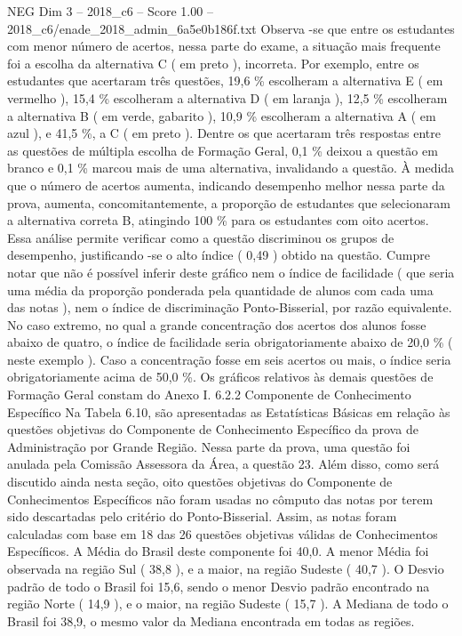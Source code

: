 \begin{textsample}{NEG Dim 3 – 2018\_c6 – Score 1.00 – 2018\_c6/enade\_2018\_admin\_6a5e0b186f.txt}
Observa -se que entre os estudantes com menor número de acertos, nessa parte do exame, a situação mais frequente foi a escolha da alternativa C ( em preto ), incorreta.
Por exemplo, entre os estudantes que acertaram três questões, 19,6 \% escolheram a alternativa E ( em vermelho ), 15,4 \% escolheram a alternativa D ( em laranja ), 12,5 \% escolheram a alternativa B ( em verde, gabarito ), 10,9 \% escolheram a alternativa A ( em azul ), e 41,5 \%, a C ( em preto ).
Dentre os que acertaram três respostas entre as questões de múltipla escolha de Formação Geral, 0,1 \% deixou a questão em branco e 0,1 \% marcou mais de uma alternativa, invalidando a questão.
À medida que o número de acertos aumenta, indicando desempenho melhor nessa parte da prova, aumenta, concomitantemente, a proporção de estudantes que selecionaram a alternativa correta B, atingindo 100 \% para os estudantes com oito acertos.
Essa análise permite verificar como a questão discriminou os grupos de desempenho, justificando -se o alto índice ( 0,49 ) obtido na questão.
Cumpre notar que não é possível inferir deste gráfico nem o índice de facilidade ( que seria uma média da proporção ponderada pela quantidade de alunos com cada uma das notas ), nem o índice de discriminação Ponto-Bisserial, por razão equivalente.
No caso extremo, no qual a grande concentração dos acertos dos alunos fosse abaixo de quatro, o índice de facilidade seria obrigatoriamente abaixo de 20,0 \% ( neste exemplo ).
Caso a concentração fosse em seis acertos ou mais, o índice seria obrigatoriamente acima de 50,0 \%.
Os gráficos relativos às demais questões de Formação Geral constam do Anexo I. 6.2.2 Componente de Conhecimento Específico Na Tabela 6.10, são apresentadas as Estatísticas Básicas em relação às questões objetivas do Componente de Conhecimento Específico da prova de Administração por Grande Região.
Nessa parte da prova, uma questão foi anulada pela Comissão Assessora da Área, a questão 23.
Além disso, como será discutido ainda nesta seção, oito questões objetivas do Componente de Conhecimentos Específicos não foram usadas no cômputo das notas por terem sido descartadas pelo critério do Ponto-Bisserial.
Assim, as notas foram calculadas com base em 18 das 26 questões objetivas válidas de Conhecimentos Específicos.
A Média do Brasil deste componente foi 40,0.
A menor Média foi observada na região Sul ( 38,8 ), e a maior, na região Sudeste ( 40,7 ).
O Desvio padrão de todo o Brasil foi 15,6, sendo o menor Desvio padrão encontrado na região Norte ( 14,9 ), e o maior, na região Sudeste ( 15,7 ).
A Mediana de todo o Brasil foi 38,9, o mesmo valor da Mediana encontrada em todas as regiões.

\end{textsample}
